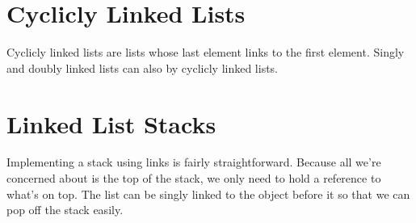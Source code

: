\documentclass{article}
\begin{document}
\section{Cyclicly Linked Lists}
Cyclicly linked lists are lists whose last element links to the first element.
Singly and doubly linked lists can also by cyclicly linked lists.

\section{Linked List Stacks}
Implementing a stack using links is fairly straightforward. Because all we're
concerned about is the top of the stack, we only need to hold a reference to
what's on top. The list can be singly linked to the object before it so that we
can pop off the stack easily.
\end{document}
